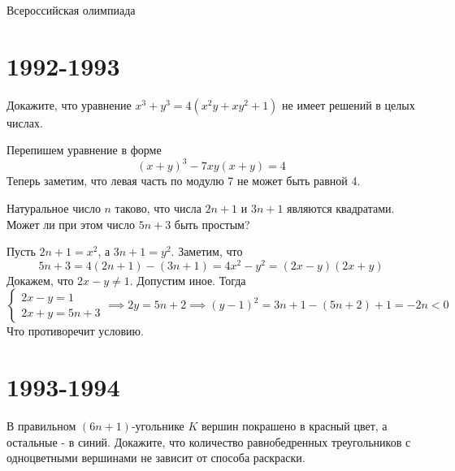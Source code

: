 \documentclass[11pt, a4paper]{problems_template}
\begin{document}
\begin{titlepage}
  \begin{center}
	\Huge{Всероссийская олимпиада}
  \end{center}
\end{titlepage} 

\chapter{1992-1993}

\begin{exercise}
Докажите, что уравнение $x^{3} + y^{3} = 4(x^{2} y + xy^{2} + 1)$ не имеет решений в целых числах.
\end{exercise}

\begin{Solution}
Перепишем уравнение в форме
$$
(x + y)^{3} - 7xy(x + y) = 4
$$
Теперь заметим, что левая часть по модулю 7 не может быть равной 4. 
\end{Solution}

\begin{exercise}
Натуральное число $n$ таково, что числа $2n + 1$ и $3n + 1$ являются
квадратами. Может ли при этом число $5n + 3$ быть простым?
\end{exercise}

\begin{Solution}
Пусть $2n+1=x^{2}$, а $3n+1 = y^{2}$. Заметим, что
$$
5n+3 = 4(2n+1) - (3n+1) = 4x^{2} - y^{2} = (2x - y)(2x + y)
$$
Докажем, что $2x - y \neq 1$. Допустим иное. Тогда
$$
\begin{cases}
2x - y = 1 \\
2x + y = 5n + 3
\end{cases} \implies 2y = 5n + 2 \implies (y - 1)^{2} = 3n+1 - (5n + 2) + 1 = -2n < 0
$$
Что противоречит условию.
\end{Solution}

\chapter{1993-1994}

\begin{exercise}
В правильном $(6n+1)$-угольнике $K$ вершин покрашено в красный цвет, а остальные - в синий. Докажите, что количество равнобедренных треугольников с одноцветными вершинами не зависит от способа раскраски.
\end{exercise}
\end{document}
